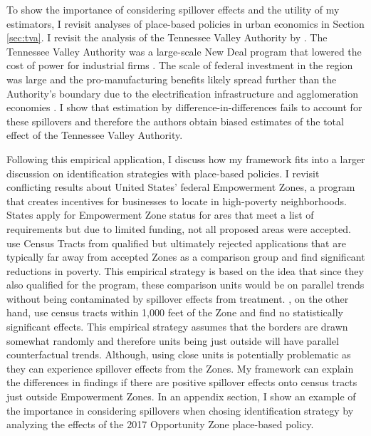 \documentclass[11pt]{article}
\begin{document}
To show the importance of considering spillover effects and the utility of my estimators, I revisit analyses of place-based policies in urban economics in Section \ref{sec:tva}. I revisit the analysis of the Tennessee Valley Authority by \citet{Kline_Moretti_2014}. The Tennessee Valley Authority was a large-scale New Deal program that lowered the cost of power for industrial firms \citep{Kitchens_2014}. The scale of federal investment in the region was large and the pro-manufacturing benefits likely spread further than the Authority's boundary due to the electrification infrastructure and agglomeration economies \citep{Severnini_2014}. I show that estimation by difference-in-differences fails to account for these spillovers and therefore the authors obtain biased estimates of the total effect of the Tennessee Valley Authority.

Following this empirical application, I discuss how my framework fits into a larger discussion on identification strategies with place-based policies. I revisit conflicting results about United States' federal Empowerment Zones, a program that creates incentives for businesses to locate in high-poverty neighborhoods. States apply for Empowerment Zone status for ares that meet a list of requirements but due to limited funding, not all proposed areas were accepted. \citet{Busso_Gregory_Kline_2013} use Census Tracts from qualified but ultimately rejected applications that are typically far away from accepted Zones as a comparison group and find significant reductions in poverty. This empirical strategy is based on the idea that since they also qualified for the program, these comparison units would be on parallel trends without being contaminated by spillover effects from treatment. \citet{Neumark_Kolko_2010}, on the other hand, use census tracts within 1,000 feet of the Zone and find no statistically significant effects. This empirical strategy assumes that the borders are drawn somewhat randomly and therefore units being just outside will have parallel counterfactual trends. Although, using close units is potentially problematic as they can experience spillover effects from the Zones. My framework can explain the differences in findings if there are positive spillover effects onto census tracts just outside Empowerment Zones. In an appendix section, I show an example of the importance in considering spillovers when chosing identification strategy by analyzing the effects of the 2017 Opportunity Zone place-based policy.
\end{document}
